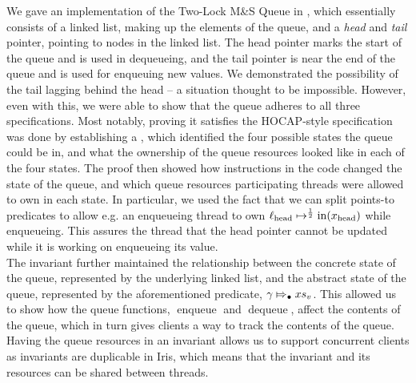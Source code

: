 \documentclass[a4paper, 10pt]{report}
\theoremstyle{definition}
\newcommand{\enqueue}{\operatorname{enqueue}}
\newcommand{\dequeue}{\operatorname{dequeue}}
\newcommand{\msq}{M\&S Queue}
\newcommand{\tlmsq}{Two-Lock \msq{}}
\newcommand{\locN}[1]{\loc_{\mathrm{#1}}}
\newcommand{\lochead}{\locN{head}}
\newcommand{\nIn}[1]{\operatorname{in}(#1)}
\newcommand{\node}{x}
\newcommand{\nodeN}[1]{\node_{\mathrm{#1}}}
\newcommand{\nodehead}{\nodeN{head}}
\newcommand{\absvalueList}{xs_v}
\newcommand{\abstractstateauth}[2]{#1 \Mapsto_{\bullet} #2}
\begin{document}
We gave an implementation of the \tlmsq{} in \heaplang{}, which essentially consists of a linked list, making up the elements of the queue, and a \textit{head} and \textit{tail} pointer, pointing to nodes in the linked list. The head pointer marks the start of the queue and is used in dequeueing, and the tail pointer is near the end of the queue and is used for enqueuing new values. We demonstrated the possibility of the tail lagging behind the head -- a situation thought to be impossible. However, even with this, we were able to show that the queue adheres to all three specifications. Most notably, proving it satisfies the HOCAP-style specification was done by establishing a , which identified the four possible states the queue could be in, and what the ownership of the queue resources looked like in each of the four states. The proof then showed how instructions in the code changed the state of the queue, and which queue resources participating threads were allowed to own in each state. In particular, we used the fact that we can split points-to predicates to allow e.g. an enqueueing thread to own $\lochead \mapsto^{\frac{1}{2}} \nIn{\nodehead}$ while enqueueing. This assures the thread that the head pointer cannot be updated while it is working on enqueueing its value.\\
The invariant further maintained the relationship between the concrete state of the queue, represented by the underlying linked list, and the abstract state of the queue, represented by the aforementioned predicate, $\abstractstateauth{\gname}{\absvalueList}$. This allowed us to show how the queue functions, $\enqueue$ and $\dequeue$, affect the contents of the queue, which in turn gives clients a way to track the contents of the queue.\\
Having the queue resources in an invariant allows us to support concurrent clients as invariants are duplicable in Iris, which means that the invariant and its resources can be shared between threads.
\end{document}
